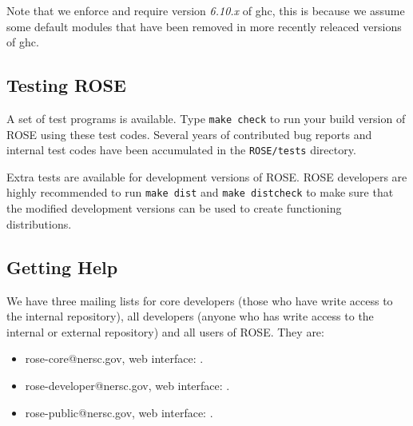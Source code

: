 Note that we enforce and require version {\em 6.10.x} of ghc, this is
because we assume some default modules that have been removed in more 
recently releaced versions of ghc.

\subsection{Testing ROSE}
     A set of test programs is available.  %
Type {\tt make check} to run your build version of ROSE using these test codes.  
Several years of contributed bug reports and internal test codes have been accumulated 
in the {\tt ROSE/tests} directory.

Extra tests are available for development versions of ROSE. ROSE developers
are highly recommended to run {\tt make dist} and {\tt make distcheck} to make
sure that the modified development versions can be used to create functioning
distributions.

\subsection{Getting Help}

%

We have three mailing lists for core developers (those who have write access to
the internal repository), all developers (anyone who has write access to the
internal or external repository) and all
users of ROSE. They are:
\begin{itemize}
\item rose-core@nersc.gov, web interface: 
.
\item rose-developer@nersc.gov, web interface: 
.
\item rose-public@nersc.gov, web interface:
.
\end{itemize}



